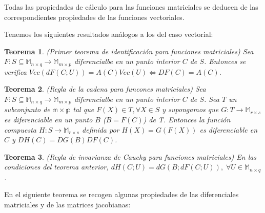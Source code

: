 \documentclass{article}
\theoremstyle{theorem-style}  %
\newtheorem{theorem}{Teorema}[section]  %
\theoremstyle{definition-style}
\theoremstyle{example-style}
\theoremstyle{exercise-style}
\begin{document}
	Todas las propiedades de cálculo para las funciones matriciales se deducen de las correspondientes propiedades de las funciones vectoriales.
	
	Tenemos los siguientes resultados análogos a los del caso vectorial:
	
	\begin{theorem} (Primer teorema de identificación para funciones matriciales)
		Sea $F:S\subseteq \mathbb{M}_{n \times q}\rightarrow \mathbb{M}_{m \times p}$ diferencialbe en un punto interior $C$ de $S$. Entonces se verifica $Vec(dF(C;U))=A(C)Vec(U) \Leftrightarrow DF(C)=A(C)$.	
	\end{theorem}
	
	\begin{theorem} (Regla de la cadena para funcones matriciales)
		Sea $F:S\subseteq \mathbb{M}_{n \times q}\rightarrow \mathbb{M}_{m \times p}$ diferencialbe en un punto interior $C$ de $S$. Sea $T$ un subconjunto de $\mathbb{m\times p}$ tal que $F(X)\in T, \forall X\in S$ y supongamos que $G:T\rightarrow \mathbb{M}_{r\times s}$ es diferenciable en un punto $B$ ($B=F(C)$) de T. Entonces la función compuesta $H:S\rightarrow \mathbb{M}_{r\times s}$ definida por $H(X)=G(F(X))$ es diferenciable en $C$ y $DH(C)=DG(B)DF(C)$.
	\end{theorem}
	
	\begin{theorem}(Regla de invarianza de Cauchy para funciones matriciales)
		En las condiciones del teorema anterior, $dH(C;U)=dG(B;dF(C;U)), \; \forall U\in \mathbb{M}_{n\times q}$.	
	\end{theorem}
	
	
	
	En el siguiente teorema se recogen algunas propiedades de las diferenciales matriciales y de las matrices jacobianas:
	
\end{document}
